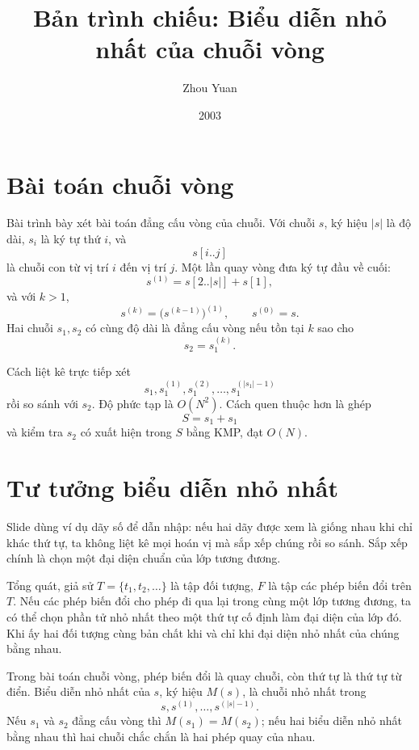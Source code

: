 \documentclass[11pt]{article}
\title{Bản trình chiếu: Biểu diễn nhỏ nhất của chuỗi vòng}
\author{Zhou Yuan}
\date{2003}
\begin{document}
\maketitle


\section{Bài toán chuỗi vòng}

Bài trình bày xét bài toán đẳng cấu vòng của chuỗi. Với chuỗi \(s\), ký hiệu
\(|s|\) là độ dài, \(s_i\) là ký tự thứ \(i\), và
\[
  s[i..j]
\]
là chuỗi con từ vị trí \(i\) đến vị trí \(j\). Một lần quay vòng đưa ký tự đầu
về cuối:
\[
  s^{(1)}=s[2..|s|]+s[1],
\]
và với \(k>1\),
\[
  s^{(k)}=\bigl(s^{(k-1)}\bigr)^{(1)},\qquad s^{(0)}=s.
\]
Hai chuỗi \(s_1,s_2\) có cùng độ dài là đẳng cấu vòng nếu tồn tại \(k\) sao
cho
\[
  s_2=s_1^{(k)}.
\]

Cách liệt kê trực tiếp xét
\[
  s_1,s_1^{(1)},s_1^{(2)},\ldots,s_1^{(|s_1|-1)}
\]
rồi so sánh với \(s_2\). Độ phức tạp là \(O(N^2)\). Cách quen thuộc hơn là
ghép
\[
  S=s_1+s_1
\]
và kiểm tra \(s_2\) có xuất hiện trong \(S\) bằng KMP, đạt \(O(N)\).

\section{Tư tưởng biểu diễn nhỏ nhất}

Slide dùng ví dụ dãy số để dẫn nhập: nếu hai dãy được xem là giống nhau khi
chỉ khác thứ tự, ta không liệt kê mọi hoán vị mà sắp xếp chúng rồi so sánh.
Sắp xếp chính là chọn một đại diện chuẩn của lớp tương đương.

Tổng quát, giả sử \(T=\{t_1,t_2,\ldots\}\) là tập đối tượng, \(F\) là tập các
phép biến đổi trên \(T\). Nếu các phép biến đổi cho phép đi qua lại trong
cùng một lớp tương đương, ta có thể chọn phần tử nhỏ nhất theo một thứ tự cố
định làm đại diện của lớp đó. Khi ấy hai đối tượng cùng bản chất khi và chỉ
khi đại diện nhỏ nhất của chúng bằng nhau.

Trong bài toán chuỗi vòng, phép biến đổi là quay chuỗi, còn thứ tự là thứ tự
từ điển. Biểu diễn nhỏ nhất của \(s\), ký hiệu \(M(s)\), là chuỗi nhỏ nhất
trong
\[
  s,s^{(1)},\ldots,s^{(|s|-1)}.
\]
Nếu \(s_1\) và \(s_2\) đẳng cấu vòng thì \(M(s_1)=M(s_2)\); nếu hai biểu diễn
nhỏ nhất bằng nhau thì hai chuỗi chắc chắn là hai phép quay của nhau.
\end{document}

